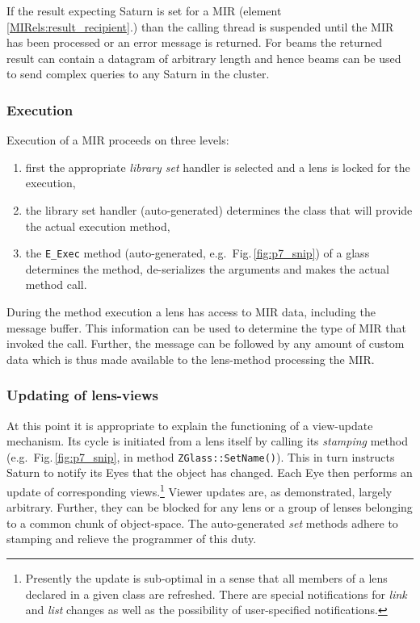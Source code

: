 \documentclass[a4paper,11pt]{article}
\def\smalltt#1{{\small\texttt{#1}}}
\begin{document}
If the result expecting Saturn is set for a MIR (element
\ref{MIRels:result_recipient}.) than the calling thread is suspended
until the MIR has been processed or an error message is returned. For
beams the returned result can contain a datagram of arbitrary length
and hence beams can be used to send complex queries to any Saturn in
the cluster.


\subsubsection{Execution}

Execution of a MIR proceeds on three levels:
\begin{enumerate}
\item first the appropriate \emph{library set} handler is selected and
  a lens is locked for the execution,
\item the library set handler (auto-generated) determines the class
  that will provide the actual execution method,
\item the \smalltt{E\_Exec} method (auto-generated, e.g.\ 
  Fig.\,\ref{fig:p7_snip}) of a glass determines the method,
  de-serializes the arguments and makes the actual method call.
\end{enumerate}
During the method execution a lens has access to MIR data, including
the message buffer. This information can be used to determine the type
of MIR that invoked the call. Further, the message can be followed by
any amount of custom data which is thus made available to the
lens-method processing the MIR.

\subsubsection{Updating of lens-views}
\label{ssec:DM_Stamping}

At this point it is appropriate to explain the functioning of a
view-update mechanism. Its cycle is initiated from a lens itself by
calling its \emph{stamping} method (e.g.\ Fig.\,\ref{fig:p7_snip}, in
method \smalltt{ZGlass::SetName()}). This in turn instructs Saturn to
notify its Eyes that the object has changed. Each Eye then performs an
update of corresponding views.\footnote{%
  Presently the update is sub-optimal in a sense that all members of a
  lens declared in a given class are refreshed. There are special
  notifications for \emph{link} and \emph{list} changes as well as the
  possibility of user-specified
  notifications.} %
Viewer updates are, as demonstrated, largely arbitrary. Further, they
can be blocked for any lens or a group of lenses belonging to a common
chunk of object-space. The auto-generated \emph{set} methods adhere to
stamping and relieve the programmer of this duty.
\end{document}
